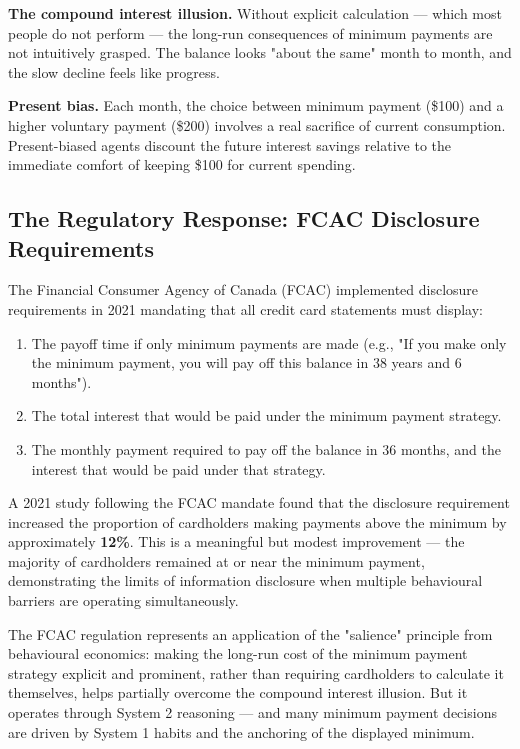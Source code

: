 \documentclass[12pt, letterpaper]{article}
\begin{document}
\textbf{The compound interest illusion.} Without explicit calculation --- which most people do not perform --- the long-run consequences of minimum payments are not intuitively grasped. The balance looks "about the same" month to month, and the slow decline feels like progress.

\textbf{Present bias.} Each month, the choice between minimum payment (\$100) and a higher voluntary payment (\$200) involves a real sacrifice of current consumption. Present-biased agents discount the future interest savings relative to the immediate comfort of keeping \$100 for current spending.


\subsection{The Regulatory Response: FCAC Disclosure Requirements}


The Financial Consumer Agency of Canada (FCAC) implemented disclosure requirements in 2021 mandating that all credit card statements must display:
\begin{enumerate}
\item The payoff time if only minimum payments are made (e.g., "If you make only the minimum payment, you will pay off this balance in 38 years and 6 months").
\item The total interest that would be paid under the minimum payment strategy.
\item The monthly payment required to pay off the balance in 36 months, and the interest that would be paid under that strategy.
\end{enumerate}

A 2021 study following the FCAC mandate found that the disclosure requirement increased the proportion of cardholders making payments above the minimum by approximately \textbf{12\%}. This is a meaningful but modest improvement --- the majority of cardholders remained at or near the minimum payment, demonstrating the limits of information disclosure when multiple behavioural barriers are operating simultaneously.

The FCAC regulation represents an application of the "salience" principle from behavioural economics: making the long-run cost of the minimum payment strategy explicit and prominent, rather than requiring cardholders to calculate it themselves, helps partially overcome the compound interest illusion. But it operates through System 2 reasoning --- and many minimum payment decisions are driven by System 1 habits and the anchoring of the displayed minimum.
\end{document}
